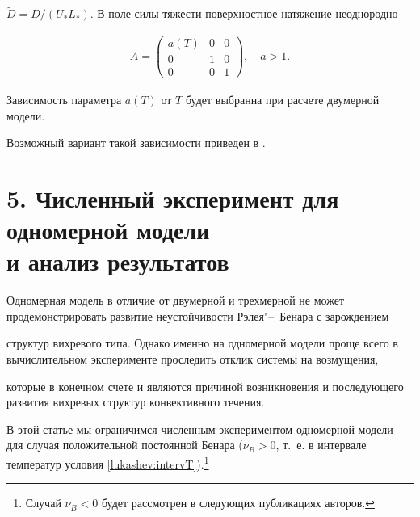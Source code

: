 $\widetilde{D}=D/(U_*L_*)$. В поле силы тяжести поверхностное натяжение неоднородно

\begin{gather}

A=\begin{pmatrix}

a(T)&0&0\\

0&1&0\\

0&0&1\end{pmatrix},\quad a>1. \label{lukashev:A}

\end{gather}

Зависимость параметра $a(T)$ от $T$ будет выбранна при расчете двумерной модели.

Возможный вариант такой зависимости приведен в \cite{lukashev:bib54}.



\smallskip



\section*{\large 5. Численный эксперимент для одномерной модели \\ \phantom{5.} и анализ результатов}



\indent





Одномерная модель  в отличие от двумерной и трехмерной не может продемонстрировать развитие неустойчивости Рэлея"--~Бенара с зарождением \linebreak

структур вихревого типа. Однако именно на одномерной модели проще всего в вычислительном эксперименте проследить отклик системы на возмущения,

которые в конечном счете и являются причиной возникновения и последующего развития вихревых структур конвективного течения.



В этой статье мы ограничимся численным экспериментом одномерной модели для случая положительной постоянной Бенара ($\nu_B>0$, т.~е. в интервале температур условия \eqref{lukashev:intervT}).\footnote{Случай $\nu_B<0$ будет рассмотрен в следующих публикациях авторов.} 







